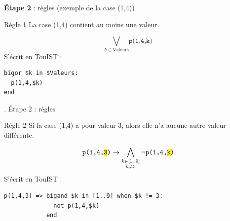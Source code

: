 \documentclass[english,french,usenames,dvipsnames]{beamer}
\begin{document}
\begin{frame}[containsverbatim]{\subsecname}
\textbf{Étape 2} : règles (exemple de la case (1,4))
\begin{exampleblock}{Règle 1}
La case (1,4) contient au moins une valeur.
\end{exampleblock}
\[\bigvee_{k\in \text{Valeurs}} \texttt{p(1,4,k)}\]
S'écrit en TouIST :
\begin{small}
\begin{verbatim}
bigor $k in $Valeurs:
  p(1,4,$k)
end
\end{verbatim}
\end{small}
\end{frame}

\begin{frame}[containsverbatim]{\subsecname. Étape 2 : règles}
\begin{exampleblock}{Règle 2}
Si la case (1,4) a pour valeur 3, alors elle n'a aucune autre valeur différente.
\end{exampleblock}
\[\texttt{p(1,4,\hl{3})} \rightarrow \bigwedge_{\substack{k\in [1..9] \\ k\neq 3}} \neg \texttt{p(1,4,\hl{k})} \]
S'écrit en TouIST :
\begin{verbatim}
p(1,4,3) => bigand $k in [1..9] when $k != 3:
              not p(1,4,$k)
            end
\end{verbatim}
\end{frame}



\begin{frame}
\end{frame}
\end{document}
